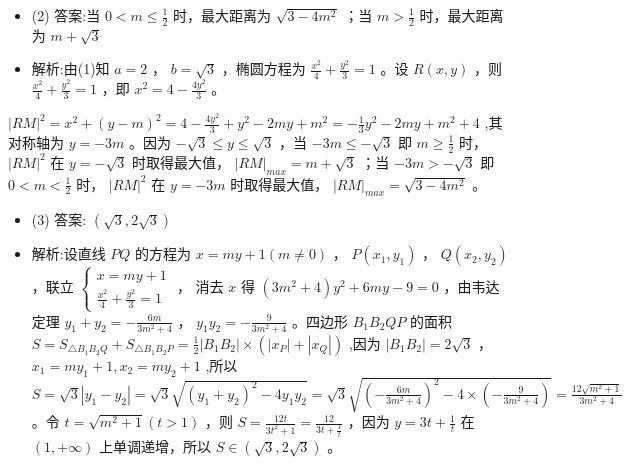 \documentclass[10pt]{article}
\begin{document}
\begin{itemize}\relax
\item\relax (2) 答案:当 \(0 < m \leq  \frac{1}{2}\) 时，最大距离为 \(\sqrt{3 - 4{m}^{2}}\) ；当 \(m > \frac{1}{2}\) 时，最大距离为 \(m + \sqrt{3}\)
\end{itemize}

\begin{itemize}\relax
\item\relax 解析:由(1)知 \(a = 2\) ， \(b = \sqrt{3}\) ，椭圆方程为 \(\frac{{x}^{2}}{4} + \frac{{y}^{2}}{3} = 1\) 。设 \(R\left( {x,y}\right)\) ，则 \(\frac{{x}^{2}}{4} + \frac{{y}^{2}}{3} = 1\) ，即 \({x}^{2} = 4 - \frac{4{y}^{2}}{3}\) 。
\end{itemize}

\({\left| RM\right| }^{2} = {x}^{2} + {\left( y - m\right) }^{2} = 4 - \frac{4{y}^{2}}{3} + {y}^{2} - {2my} + {m}^{2} =  - \frac{1}{3}{y}^{2} - {2my} + {m}^{2} + 4\) ,其对称轴为 \(y =  - {3m}\) 。因为 \(- \sqrt{3} \leq  y \leq  \sqrt{3}\) ，当 \(- {3m} \leq   - \sqrt{3}\) 即 \(m \geq  \frac{1}{2}\) 时， \({\left| RM\right| }^{2}\) 在 \(y =  - \sqrt{3}\) 时取得最大值， \({\left| RM\right| }_{max} = m + \sqrt{3}\) ；当 \(- {3m} >  - \sqrt{3}\) 即 \(0 < m < \frac{1}{2}\) 时， \({\left| RM\right| }^{2}\) 在 \(y =  - {3m}\) 时取得最大值， \({\left| RM\right| }_{max} = \sqrt{3 - 4{m}^{2}}\) 。

\begin{itemize}\relax
\item\relax (3) 答案: \(\left( {\sqrt{3},2\sqrt{3}}\right)\)
\end{itemize}

\begin{itemize}\relax
\item\relax 解析:设直线 \({PQ}\) 的方程为 \(x = {my} + 1\left( {m \neq  0}\right)\) ， \(P\left( {{x}_{1},{y}_{1}}\right)\) ， \(Q\left( {{x}_{2},{y}_{2}}\right)\) ，联立 \(\left\{  \begin{array}{l} x = {my} + 1 \\  \frac{{x}^{2}}{4} + \frac{{y}^{2}}{3} = 1 \end{array}\right.\) ， 消去 \(x\) 得 \(\left( {3{m}^{2} + 4}\right) {y}^{2} + {6my} - 9 = 0\) ，由韦达定理 \({y}_{1} + {y}_{2} =  - \frac{6m}{3{m}^{2} + 4}\) ， \({y}_{1}{y}_{2} =  - \frac{9}{3{m}^{2} + 4}\) 。四边形 \({B}_{1}{B}_{2}{QP}\) 的面积 \(S = {S}_{\bigtriangleup {B}_{1}{B}_{2}Q} + {S}_{\bigtriangleup {B}_{1}{B}_{2}P} = \frac{1}{2}\left| {{B}_{1}{B}_{2}}\right|  \times  \left( {\left| {x}_{P}\right|  + \left| {x}_{Q}\right| }\right)\) ,因为 \(\left| {{B}_{1}{B}_{2}}\right|  = 2\sqrt{3}\) ， \({x}_{1} = m{y}_{1} + 1,{x}_{2} = m{y}_{2} + 1\) ,所以 \(S = \sqrt{3}\left| {{y}_{1} - {y}_{2}}\right|  = \sqrt{3}\sqrt{{\left( {y}_{1} + {y}_{2}\right) }^{2} - 4{y}_{1}{y}_{2}} = \sqrt{3}\sqrt{{\left( -\frac{6m}{3{m}^{2} + 4}\right) }^{2} - 4 \times  \left( {-\frac{9}{3{m}^{2} + 4}}\right) } = \frac{{12}\sqrt{{m}^{2} + 1}}{3{m}^{2} + 4}\) 。令 \(t = \sqrt{{m}^{2} + 1}\left( {t > 1}\right)\) ，则 \(S = \frac{12t}{3{t}^{2} + 1} = \frac{12}{{3t} + \frac{1}{t}}\) ，因为 \(y = {3t} + \frac{1}{t}\) 在 \(\left( {1, + \infty }\right)\) 上单调递增，所以 \(S \in  \left( {\sqrt{3},2\sqrt{3}}\right)\) 。
\end{itemize}
\end{document}
